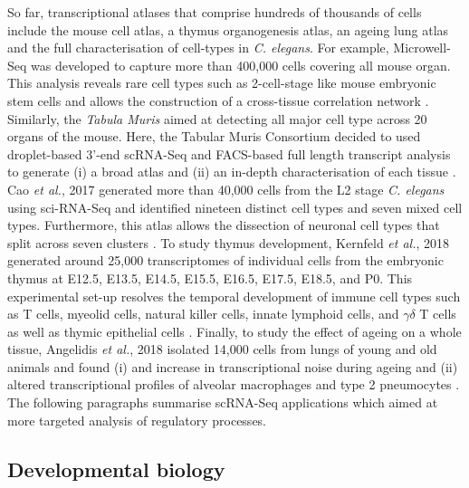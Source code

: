 So far, transcriptional atlases that comprise hundreds of thousands of cells include the mouse cell atlas, a thymus organogenesis atlas, an ageing lung atlas and the full characterisation of cell-types in \textit{C. elegans}. For example, Microwell-Seq was developed to capture more than 400,000 cells covering all mouse organ. This analysis reveals rare cell types such as 2-cell-stage like mouse embryonic stem cells and allows the construction of a cross-tissue correlation network \cite{Han2018}. Similarly, the \emph{Tabula Muris} aimed at detecting all major cell type across 20 organs of the mouse. Here, the Tabular Muris Consortium decided to used droplet-based 3'-end scRNA-Seq and FACS-based full length transcript analysis to generate (i) a broad atlas and (ii) an in-depth characterisation of each tissue \citep{Quake2018}. Cao \emph{et al.}, 2017 generated more than 40,000 cells from the L2 stage \emph{C. elegans} using sci-RNA-Seq and identified nineteen distinct cell types and seven mixed cell types. Furthermore, this atlas allows the dissection of neuronal cell types that split across seven clusters \citep{Cao2017}. To study thymus development, Kernfeld \emph{et al.}, 2018 generated around 25,000 transcriptomes of individual cells from the embryonic thymus at E12.5, E13.5, E14.5, E15.5, E16.5, E17.5, E18.5, and P0. This experimental set-up resolves the temporal development of immune cell types such as T cells, myeolid cells, natural killer cells, innate lymphoid cells, and $\gamma{}\delta{}$ T cells as well as thymic epithelial cells \citep{Kernfeld2018}. Finally, to study the effect of ageing on a whole tissue, Angelidis \emph{et al.}, 2018 isolated 14,000 cells from lungs of young and old animals and found (i) and increase in transcriptional noise during ageing and (ii) altered transcriptional profiles of alveolar macrophages and type 2 pneumocytes \citep{Angelidis2018}.\\

The following paragraphs summarise scRNA-Seq applications which aimed at more targeted analysis of regulatory processes.

\subsection{Developmental biology}

